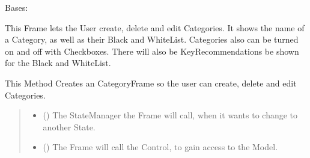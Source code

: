 \documentclass[letterpaper,10pt,english]{sphinxmanual}
\begin{document}
\begin{fulllineitems}
\label{\detokenize{apidoc/src.osm_configurator.view.toplevelframes:src.osm_configurator.view.toplevelframes.category_frame.CategoryFrame}}
\pysigstartsignatures
{}
\pysigstopsignatures
\sphinxAtStartPar
Bases: {\hyperref[\detokenize{apidoc/src.osm_configurator.view.toplevelframes:src.osm_configurator.view.toplevelframes.top_level_frame.TopLevelFrame}]{}}

\sphinxAtStartPar
This Frame lets the User create, delete and edit Categories.
It shows the name of a Category, as well as their Black\sphinxhyphen{} and White\sphinxhyphen{}List.
Categories also can be turned on and off with Checkboxes.
There will also be Key\sphinxhyphen{}Recommendations be shown for the Black\sphinxhyphen{} and White\sphinxhyphen{}List.

\begin{fulllineitems}
\label{\detokenize{apidoc/src.osm_configurator.view.toplevelframes:src.osm_configurator.view.toplevelframes.category_frame.CategoryFrame.__init__}}
\pysigstartsignatures
{}
\pysigstopsignatures
\sphinxAtStartPar
This Method Creates an CategoryFrame so the user can create, delete and edit Categories.
\begin{quote}\begin{description}
\begin{itemize}
\item {} 
\sphinxAtStartPar
{} ({\hyperref[\detokenize{apidoc/src.osm_configurator.view.states:src.osm_configurator.view.states.state_manager.StateManager}]{}}) \textendash{} The StateManager the Frame will call, when it wants to change to another State.

\item {} 
\sphinxAtStartPar
{} ({\hyperref[\detokenize{apidoc/src.osm_configurator.control:src.osm_configurator.control.control_interface.IControl}]{}}) \textendash{} The Frame will call the Control, to gain access to the Model.

\end{itemize}

\end{description}\end{quote}

\end{fulllineitems}


\end{fulllineitems}
\end{document}
